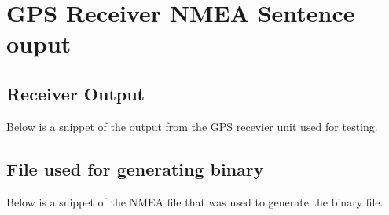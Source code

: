 
\chapter{GPS Receiver NMEA Sentence ouput} %

\label{AppendixB} %

\section{Receiver Output}
Below is a snippet of the output from the GPS recevier unit used for testing.

\section{File used for generating binary}
Below is a snippet of the NMEA file that was used to generate the binary file.
